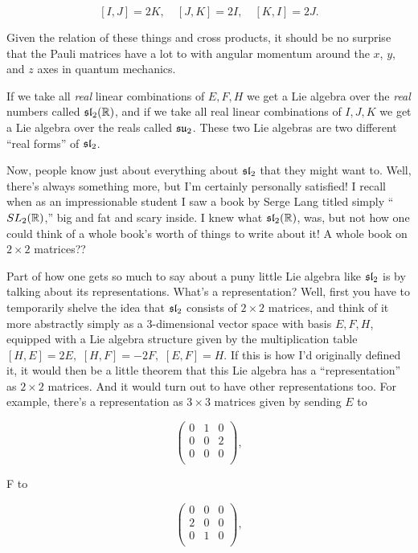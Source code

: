 \[[I,J] = 2K, \quad [J,K] = 2I, \quad [K,I] = 2J.\]

Given the relation of these things and cross products, it should be no surprise that the Pauli matrices have a lot to with angular momentum around the $x$, $y$, and $z$ axes in quantum mechanics.

If we take all \emph{real} linear combinations of $E, F, H$ we get a Lie algebra over the \emph{real} numbers called $\mathfrak{sl}_2(\mathbb R)$, and if we take all real linear combinations of $I, J, K$ we get a Lie algebra over the reals called $\mathfrak{su}_2$.  These two Lie algebras are two different ``real forms'' of $\mathfrak{sl}_2$.

Now, people know just about everything about $\mathfrak{sl}_2$ that they might want to.  Well, there's always something more, but I'm certainly personally satisfied!  I recall when as an impressionable student I saw a book by Serge Lang titled simply ``$SL_2(\mathbb R)$,'' big and fat and scary inside.  I knew what $\mathfrak{sl}_2(\mathbb R)$, was, but not how one could think of a whole book's worth of things to write about it!  A whole book on $2 \times 2$ matrices??

Part of how one gets so much to say about a puny little Lie algebra like $\mathfrak{sl}_2$ is by talking about its representations.  What's a representation?  Well, first you have to temporarily shelve the idea that $\mathfrak{sl}_2$ consists of $2 \times 2$ matrices, and think of it more abstractly simply as a 3-dimensional vector space with basis $E,F,H$, equipped with a Lie algebra structure given by the multiplication table $[H,E] = 2E,$ $[H,F] = -2F,$ $[E,F] = H$.  If this is how I'd originally defined it, it would then be a little theorem that this Lie algebra has a ``representation'' as $2 \times 2$ matrices.  And it would turn out to have other representations too.  For example, there's a representation as $3 \times 3$ matrices given by sending $E$ to

\[\begin{pmatrix}
0 & 1 & 0 \\
0 & 0 & 2 \\
0 & 0 & 0 \\
\end{pmatrix},\]

\noindent F to

\[\begin{pmatrix}
0 & 0 & 0 \\
2 & 0 & 0 \\
0 & 1 & 0 \\
\end{pmatrix},\]

